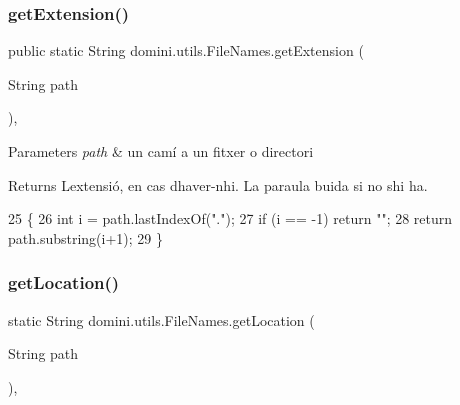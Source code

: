 \subsubsection{\texorpdfstring{get\+Extension()}{getExtension()}}
{\footnotesize\ttfamily public static String domini.\+utils.\+File\+Names.\+get\+Extension (\begin{DoxyParamCaption}\item[{String}]{path }\end{DoxyParamCaption})\hspace{0.3cm}{\ttfamily [inline]}, {\ttfamily [static]}}


\begin{DoxyParams}{Parameters}
{\em path} & un camí a un fitxer o directori \\
\hline
\end{DoxyParams}
\begin{DoxyReturn}{Returns}
L\textquotesingle{}extensió, en cas d\textquotesingle{}haver-\/n\textquotesingle{}hi. La paraula buida si no s\textquotesingle{}hi ha. 
\end{DoxyReturn}

\begin{DoxyCode}
25                                                    \{
26         \textcolor{keywordtype}{int} i = path.lastIndexOf(\textcolor{stringliteral}{"."});
27         \textcolor{keywordflow}{if} (i == -1) \textcolor{keywordflow}{return} \textcolor{stringliteral}{""};
28         \textcolor{keywordflow}{return} path.substring(i+1);
29     \}
\end{DoxyCode}
\mbox{\label{classdomini_1_1utils_1_1FileNames_afc75fde5e21552878f174ad4f28fcf21}} 
\subsubsection{\texorpdfstring{get\+Location()}{getLocation()}}
{\footnotesize\ttfamily static String domini.\+utils.\+File\+Names.\+get\+Location (\begin{DoxyParamCaption}\item[{String}]{path }\end{DoxyParamCaption})\hspace{0.3cm}{\ttfamily [inline]}, {\ttfamily [static]}}


